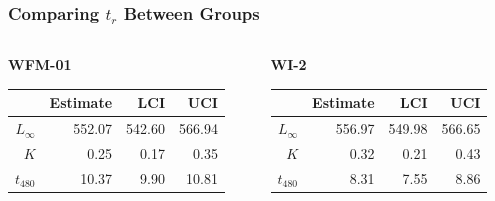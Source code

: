 \documentclass[xcolor=dvipsnames]{beamer}\usepackage[]{graphicx}\usepackage[]{color}
\begin{document}
\begin{frame}[fragile, t]
\frametitle{Comparing $t_{r}$ Between Groups}
\begin{columns}
\begin{column}{0.5\textwidth}
\textbf{WFM-01}
\begin{table}[ht]
\centering
\begin{tabular}{rrrr}
  \hline
 & Estimate & LCI & UCI \\ 
  \hline
$L_{\infty}$ & 552.07 & 542.60 & 566.94 \\ 
  $K$ & 0.25 & 0.17 & 0.35 \\ 
   \rowcolor{light-gray}$t_{480}$ & 10.37 & 9.90 & 10.81 \\ 
   \hline
\end{tabular}
\end{table}

\end{column}
\begin{column}{0.5\textwidth}
\textbf{WI-2}
\begin{table}[ht]
\centering
\begin{tabular}{rrrr}
  \hline
 & Estimate & LCI & UCI \\ 
  \hline
$L_{\infty}$ & 556.97 & 549.98 & 566.65 \\ 
  $K$ & 0.32 & 0.21 & 0.43 \\ 
   \rowcolor{light-gray}$t_{480}$ & 8.31 & 7.55 & 8.86 \\ 
   \hline
\end{tabular}
\end{table}

\end{column}
\end{columns}
\end{frame}
\end{document}
